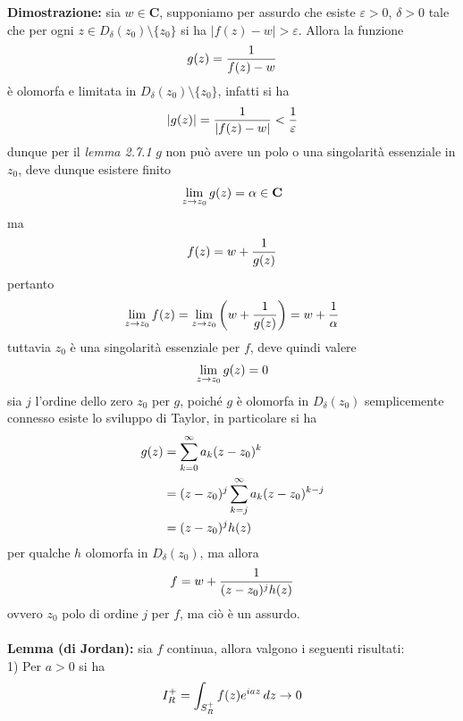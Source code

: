 \documentclass{article}
\begin{document}
\textbf{Dimostrazione:} sia $w \in \mathbf{C}$, supponiamo per assurdo che esiste $\varepsilon > 0$, $\delta > 0$ tale che per ogni $z \in D_\delta(z_0) \setminus \{z_0\}$ si ha $|f(z) - w| > \varepsilon$. Allora la funzione
\begin{gather}
    g(z) = \frac{1}{f(z) - w} \notag
\end{gather}
è olomorfa e limitata in $D_\delta(z_0) \setminus \{z_0\}$, infatti si ha
\begin{gather}
    |g(z)| = \frac{1}{|f(z) - w|} < \frac{1}{\varepsilon} \notag
\end{gather}
dunque per il \textit{lemma 2.7.1} $g$ non può avere un polo o una singolarità essenziale in $z_0$, deve dunque esistere finito
\begin{gather}
    \lim_{z \rightarrow z_0}g(z) = \alpha \in \mathbf{C} \notag
\end{gather}
ma
\begin{gather}
    f(z) = w + \frac{1}{g(z)} \notag
\end{gather}
pertanto
\begin{gather}
    \lim_{z \rightarrow z_0}f(z) = \lim_{z \rightarrow z_0}\left(w + \frac{1}{g(z)}\right) = w + \frac{1}{\alpha} \notag
\end{gather}
tuttavia $z_0$ è una singolarità essenziale per $f$, deve quindi valere
\begin{gather}
    \lim_{z \rightarrow z_0}g(z) = 0 \notag
\end{gather}
sia $j$ l'ordine dello zero $z_0$ per $g$, poiché $g$ è olomorfa in $D_\delta(z_0)$ semplicemente connesso esiste lo sviluppo di Taylor, in particolare si ha
\begin{align}
    g(z) &= \sum_{k = 0}^\infty a_k(z - z_0)^k \notag \\
    &= (z - z_0)^j\sum_{k = j}^\infty a_k(z - z_0)^{k - j} \notag \\
    &= (z - z_0)^jh(z) \notag
\end{align}
per qualche $h$ olomorfa in $D_\delta(z_0)$, ma allora
\begin{gather}
    f = w + \frac{1}{(z - z_0)^jh(z)} \notag
\end{gather}
ovvero $z_0$ polo di ordine $j$ per $f$, ma ciò è un assurdo. \\ \\
\textbf{Lemma (di Jordan):} sia $f$ continua, allora valgono i seguenti risultati: \\
1) Per $a > 0$ si ha
\begin{gather}
    I^+_R = \int_{S^+_R}f(z)e^{iaz} \, dz \rightarrow 0 \notag
\end{gather}
\end{document}
